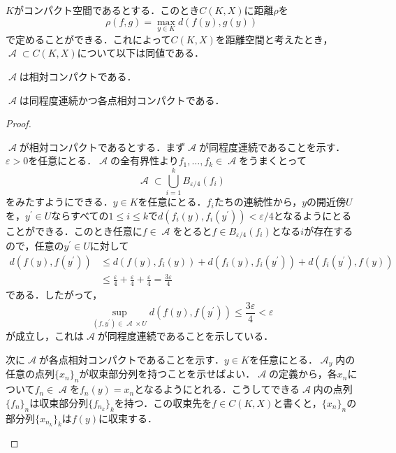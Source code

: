 \documentclass[uplatex]{jsarticle}
\begin{document}
\begin{theorem}\label{AA1}
$K$がコンパクト空間であるとする．このとき$C(K,X)$に距離$\rho$を
\[ \rho(f,g) = \max_{y\in K} d(f(y),g(y)) \]
で定めることができる．これによって$C(K,X)$を距離空間と考えたとき，$\mscrA\subset C(K,X)$について以下は同値である．
\begin{enumarabicp}
\item $\mscrA$は相対コンパクトである．
\item $\mscrA$は同程度連続かつ各点相対コンパクトである．
\end{enumarabicp}
\end{theorem}
\begin{proof}
\begin{subproof}{}
$\mscrA$が相対コンパクトであるとする．まず$\mscrA$が同程度連続であることを示す．$\varepsilon>0$を任意にとる．$\mscrA$の全有界性より$f_1,\dots ,f_k\in \mscrA$をうまくとって
\[ \mscrA \subset \bigcup_{i=1}^k B_{\varepsilon/4} (f_i) \]
をみたすようにできる．$y\in K$を任意にとる．$f_i$たちの連続性から，$y$の開近傍$U$を，$y^\prime\in U$ならすべての$1\leq i \leq k$で$d(f_i(y),f_i(y^\prime))<\varepsilon/4$となるようにとることができる．このとき任意に$f\in \mscrA$をとると$f\in B_{\varepsilon/4}(f_i)$となる$i$が存在するので，任意の$y^\prime\in U$に対して
\begin{align*}
    d(f(y),f(y^\prime))&\leq d(f(y),f_i(y)) + d(f_i(y),f_i(y^\prime)) + d(f_i(y^\prime),f(y)) \\
    &\leq \frac{\varepsilon}{4} + \frac{\varepsilon}{4} + \frac{\varepsilon}{4} = \frac{3\varepsilon}{4}
\end{align*}
である．したがって，
\[ \sup_{(f,y^\prime)\in \mscrA\times U} d(f(y),f(y^\prime))\leq \frac{3\varepsilon}{4} < \varepsilon \]
が成立し，これは$\mscrA$が同程度連続であることを示している．

次に$\mscrA$が各点相対コンパクトであることを示す．$y\in K$を任意にとる．$\mscrA_y$内の任意の点列$\{x_n\}_n$が収束部分列を持つことを示せばよい．$\mscrA$の定義から，各$x_n$について$f_n\in \mscrA$を$f_n(y)=x_n$となるようにとれる．こうしてできる$\mscrA$内の点列$\{f_n\}_n$は収束部分列$\{f_{n_k}\}_k$を持つ．この収束先を$f\in C(K,X)$と書くと，$\{x_n\}_n$の部分列$\{x_{n_k}\}_k$は$f(y)$に収束する．
\end{subproof}


\end{proof}
\end{document}
